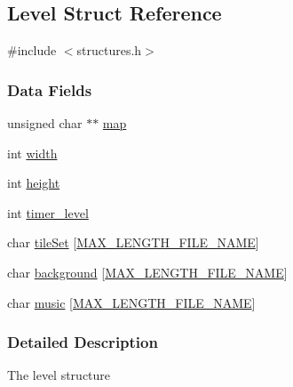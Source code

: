 \hypertarget{struct_level}{\subsection{Level Struct Reference}
\label{struct_level}
}


{\ttfamily \#include $<$structures.\-h$>$}

\subsubsection*{Data Fields}
\begin{DoxyCompactItemize}
\item 
unsigned char $\ast$$\ast$ \hyperlink{struct_level_a6d985f8729c187f1c35dabba2738f0bd}{map}
\item 
int \hyperlink{struct_level_a2474a5474cbff19523a51eb1de01cda4}{width}
\item 
int \hyperlink{struct_level_ad12fc34ce789bce6c8a05d8a17138534}{height}
\item 
int \hyperlink{struct_level_a28c59da9677a9d7b98db49328a77dc3c}{timer\-\_\-level}
\item 
char \hyperlink{struct_level_a0e7cda756abc5c35da53272e3ca3bd47}{tile\-Set} \mbox{[}\hyperlink{const_8h_a9620725a4f8ab39e0912adede7cb347f}{M\-A\-X\-\_\-\-L\-E\-N\-G\-T\-H\-\_\-\-F\-I\-L\-E\-\_\-\-N\-A\-M\-E}\mbox{]}
\item 
char \hyperlink{struct_level_ad8280c14050559fbd855943575019840}{background} \mbox{[}\hyperlink{const_8h_a9620725a4f8ab39e0912adede7cb347f}{M\-A\-X\-\_\-\-L\-E\-N\-G\-T\-H\-\_\-\-F\-I\-L\-E\-\_\-\-N\-A\-M\-E}\mbox{]}
\item 
char \hyperlink{struct_level_a36c7c7c6b9119bc9cdf5ec62ebf49554}{music} \mbox{[}\hyperlink{const_8h_a9620725a4f8ab39e0912adede7cb347f}{M\-A\-X\-\_\-\-L\-E\-N\-G\-T\-H\-\_\-\-F\-I\-L\-E\-\_\-\-N\-A\-M\-E}\mbox{]}
\end{DoxyCompactItemize}


\subsubsection{Detailed Description}
The level structure 

